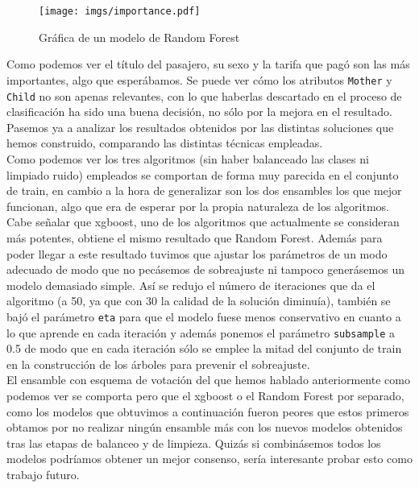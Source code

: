 \documentclass[10pt,a4paper]{article}
\newcommand{\code}[1]{\textcolor{rblue}{\texttt{#1}}} %
\begin{document}
\begin{figure}[H]
  \centering
  \texttt{[image: imgs/importance.pdf]}
  \caption{Gráfica de un modelo de Random Forest}
\end{figure}

Como podemos ver el título del pasajero, su sexo y la tarifa que pagó son las más importantes, algo que esperábamos. Se puede ver cómo los atributos \code{Mother} y \code{Child} no son apenas relevantes, con lo que haberlas descartado en el proceso de clasificación ha sido una buena decisión, no sólo por la mejora en el resultado. Pasemos ya a analizar los resultados obtenidos por las distintas soluciones que hemos construido, comparando las distintas técnicas empleadas.\\

Como podemos ver los tres algoritmos (sin haber balanceado las clases ni limpiado ruido) empleados se comportan de forma muy parecida en el conjunto de train, en cambio a la hora de generalizar son los dos ensambles los que mejor funcionan, algo que era de esperar por la propia naturaleza de los algoritmos. Cabe señalar que xgboost, uno de los algoritmos que actualmente se consideran más potentes, obtiene el mismo resultado que Random Forest. Además para poder llegar a este resultado tuvimos que ajustar los parámetros de un modo adecuado de modo que no pecásemos de sobreajuste ni tampoco generásemos un modelo demasiado simple. Así se redujo el número de iteraciones que da el algoritmo (a 50, ya que con 30 la calidad de la solución diminuía), también se bajó el parámetro \code{eta} para que el modelo fuese menos conservativo en cuanto a lo que aprende en cada iteración y además ponemos el parámetro \code{subsample} a 0.5 de modo que en cada iteración sólo se emplee la mitad del conjunto de train en la construcción de los árboles para prevenir el sobreajuste.\\

El ensamble con esquema de votación del que hemos hablado anteriormente como podemos ver se comporta pero que el xgboost o el Random Forest por separado, como los modelos que obtuvimos a continuación fueron peores que estos primeros obtamos por no realizar ningún ensamble más con los nuevos modelos obtenidos tras las etapas de balanceo y de limpieza. Quizás si combinásemos todos los modelos podríamos obtener un mejor consenso, sería interesante probar esto como trabajo futuro.\\
\end{document}
